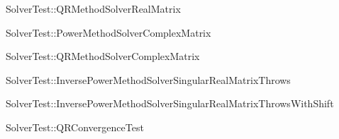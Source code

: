 \begin{DoxyRefList}
\item[Member \mbox{\hyperlink{test_8cpp_a9e6c3322cba11719ebb75248f85d2895}{TEST\+\_\+F}} (\mbox{\hyperlink{classSolverTest}{Solver\+Test}}, QRMethod\+Solver\+Real\+Matrix)]\label{test__test000009}%
%
Solver\+Test\+::\+QRMethod\+Solver\+Real\+Matrix  
\item[Member \mbox{\hyperlink{test_8cpp_a4389b25dc7882cbcfd6d76718571e68d}{TEST\+\_\+F}} (\mbox{\hyperlink{classSolverTest}{Solver\+Test}}, Power\+Method\+Solver\+Complex\+Matrix)]\label{test__test000010}%
%
Solver\+Test\+::\+Power\+Method\+Solver\+Complex\+Matrix  
\item[Member \mbox{\hyperlink{test_8cpp_a2538cf0e0d9aa2980727f00fdfc08118}{TEST\+\_\+F}} (\mbox{\hyperlink{classSolverTest}{Solver\+Test}}, QRMethod\+Solver\+Complex\+Matrix)]\label{test__test000011}%
%
Solver\+Test\+::\+QRMethod\+Solver\+Complex\+Matrix  
\item[Member \mbox{\hyperlink{test_8cpp_adb87e53cbc0365d0811117e1550dad8b}{TEST\+\_\+F}} (\mbox{\hyperlink{classSolverTest}{Solver\+Test}}, Inverse\+Power\+Method\+Solver\+Singular\+Real\+Matrix\+Throws)]\label{test__test000012}%
%
Solver\+Test\+::\+Inverse\+Power\+Method\+Solver\+Singular\+Real\+Matrix\+Throws  
\item[Member \mbox{\hyperlink{test_8cpp_aca701873d6b96de8eaac9bcb39c520a7}{TEST\+\_\+F}} (\mbox{\hyperlink{classSolverTest}{Solver\+Test}}, Inverse\+Power\+Method\+Solver\+Singular\+Real\+Matrix\+Throws\+With\+Shift)]\label{test__test000013}%
%
Solver\+Test\+::\+Inverse\+Power\+Method\+Solver\+Singular\+Real\+Matrix\+Throws\+With\+Shift  
\item[Member \mbox{\hyperlink{test_8cpp_a29872aa5ec4da5e3debdbf1b498dd331}{TEST\+\_\+F}} (\mbox{\hyperlink{classSolverTest}{Solver\+Test}}, QRConvergence\+Test)]\label{test__test000014}%
%
Solver\+Test\+::\+QRConvergence\+Test 
\end{DoxyRefList}